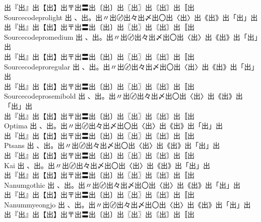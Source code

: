 \begin{tabbing}
\> {\mktsFontfileSourcecodeproextralight{}出『出』出【出】出〒出〓出〔出〕出〖出〗出〘出〙出〚出} \\
Sourcecodeprolight \> {\mktsFontfileSourcecodeprolight{}出 、出。出〃出〄出々出〆出〇出〈出〉出《出》出「出」出}\\
\> {\mktsFontfileSourcecodeprolight{}出『出』出【出】出〒出〓出〔出〕出〖出〗出〘出〙出〚出} \\
Sourcecodepromedium \> {\mktsFontfileSourcecodepromedium{}出 、出。出〃出〄出々出〆出〇出〈出〉出《出》出「出」出}\\
\> {\mktsFontfileSourcecodepromedium{}出『出』出【出】出〒出〓出〔出〕出〖出〗出〘出〙出〚出} \\
Sourcecodeproregular \> {\mktsFontfileSourcecodeproregular{}出 、出。出〃出〄出々出〆出〇出〈出〉出《出》出「出」出}\\
\> {\mktsFontfileSourcecodeproregular{}出『出』出【出】出〒出〓出〔出〕出〖出〗出〘出〙出〚出} \\
Sourcecodeprosemibold \> {\mktsFontfileSourcecodeprosemibold{}出 、出。出〃出〄出々出〆出〇出〈出〉出《出》出「出」出}\\
\> {\mktsFontfileSourcecodeprosemibold{}出『出』出【出】出〒出〓出〔出〕出〖出〗出〘出〙出〚出} \\
Optima \> {\mktsFontfileOptima{}出 、出。出〃出〄出々出〆出〇出〈出〉出《出》出「出」出}\\
\> {\mktsFontfileOptima{}出『出』出【出】出〒出〓出〔出〕出〖出〗出〘出〙出〚出} \\
Ptsans \> {\mktsFontfilePtsans{}出 、出。出〃出〄出々出〆出〇出〈出〉出《出》出「出」出}\\
\> {\mktsFontfilePtsans{}出『出』出【出】出〒出〓出〔出〕出〖出〗出〘出〙出〚出} \\
Kai \> {\mktsFontfileKai{}出 、出。出〃出〄出々出〆出〇出〈出〉出《出》出「出」出}\\
\> {\mktsFontfileKai{}出『出』出【出】出〒出〓出〔出〕出〖出〗出〘出〙出〚出} \\
Nanumgothic \> {\mktsFontfileNanumgothic{}出 、出。出〃出〄出々出〆出〇出〈出〉出《出》出「出」出}\\
\> {\mktsFontfileNanumgothic{}出『出』出【出】出〒出〓出〔出〕出〖出〗出〘出〙出〚出} \\
Nanummyeongjo \> {\mktsFontfileNanummyeongjo{}出 、出。出〃出〄出々出〆出〇出〈出〉出《出》出「出」出}\\
\> {\mktsFontfileNanummyeongjo{}出『出』出【出】出〒出〓出〔出〕出〖出〗出〘出〙出〚出} \\

\end{tabbing}
